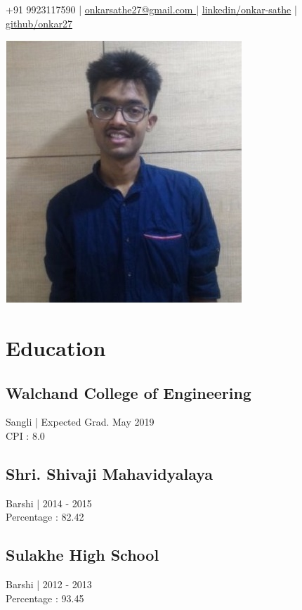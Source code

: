 \documentclass[]{hieudo-build}
\begin{document}
%
%

{ +91 9923117590  |  \href{mailto:onkarsathe27@gmail.com}{onkarsathe27@gmail.com }  |  \href{https://www.linkedin.com/in/onkar-sathe/}{linkedin/onkar-sathe}  |  \href{https://github.com/onkar27}{github/onkar27 }}

\begin{minipage}{0.38\textwidth}
\includegraphics[width=.5\linewidth]{profile.jpg}


\section{Education}
\subsection{Walchand College of Engineering}
Sangli | Expected Grad. May 2019 \\
CPI : 8.0\\
\sectionsep

\subsection{Shri. Shivaji Mahavidyalaya}
 Barshi | 2014 - 2015 \\
Percentage : 82.42 %
\sectionsep

\subsection{Sulakhe High School}
 Barshi | 2012 - 2013 \\
Percentage : 93.45 %


\end{minipage}
\end{document}
